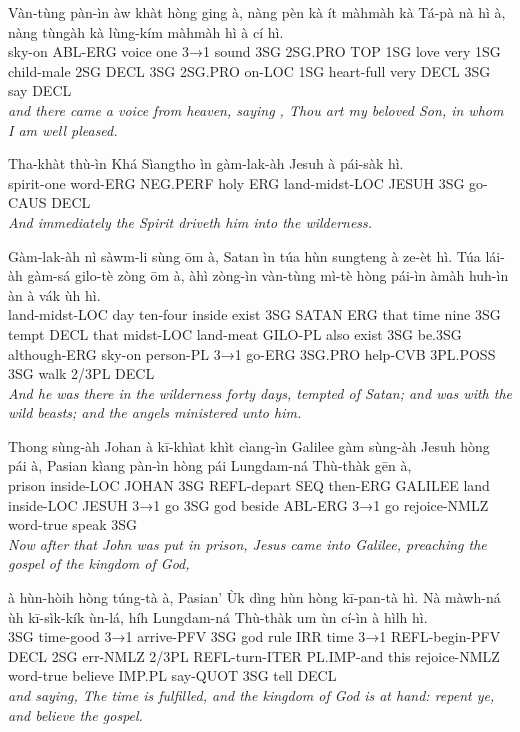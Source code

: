 \documentclass[11pt,a4paper]{article}
\begin{document}
\begin{exe}
\gll Vàn-tùng pàn-ìn àw khàt hòng ging à, nàng pèn kà ít màhmàh kà Tá-pà nà hì à, nàng tùngàh kà lùng-kím màhmàh hì à cí hì. \\
     sky-on ABL-ERG voice one 3→1 sound 3SG 2SG.PRO TOP 1SG love very 1SG child-male 2SG DECL 3SG 2SG.PRO on-LOC 1SG heart-full very DECL 3SG say DECL \\
\glt \textcolor{kjvcolor}{\textit{and there came a voice from heaven, saying , Thou art my beloved Son, in whom I am well pleased.}}

\gll Tha-khàt thù-ìn Khá Sìangtho ìn gàm-lak-àh Jesuh à pái-sàk hì. \\
     spirit-one word-ERG NEG.PERF holy ERG land-midst-LOC JESUH 3SG go-CAUS DECL \\
\glt \textcolor{kjvcolor}{\textit{And immediately the Spirit driveth him into the wilderness.}}

\gll Gàm-lak-àh nì sàwm-li sùng ōm à, Satan ìn túa hùn sungteng à ze-èt hì. Túa lái-àh gàm-sá gilo-tè zòng ōm à, àhì zòng-ìn vàn-tùng mì-tè hòng pái-ìn àmàh huh-ìn àn à vák ùh hì. \\
     land-midst-LOC day ten-four inside exist 3SG SATAN ERG that time nine 3SG tempt DECL that midst-LOC land-meat GILO-PL also exist 3SG be.3SG although-ERG sky-on person-PL 3→1 go-ERG 3SG.PRO help-CVB 3PL.POSS 3SG walk 2/3PL DECL \\
\glt \textcolor{kjvcolor}{\textit{And he was there in the wilderness forty days, tempted of Satan; and was with the wild beasts; and the angels ministered unto him.}}

\gll Thong sùng-àh Johan à kī-khìat khìt cìang-ìn Galilee gàm sùng-àh Jesuh hòng pái à, Pasian kìang pàn-ìn hòng pái Lungdam-ná Thù-thàk gēn à, \\
     prison inside-LOC JOHAN 3SG REFL-depart SEQ then-ERG GALILEE land inside-LOC JESUH 3→1 go 3SG god beside ABL-ERG 3→1 go rejoice-NMLZ word-true speak 3SG \\
\glt \textcolor{kjvcolor}{\textit{Now after that John was put in prison, Jesus came into Galilee, preaching the gospel of the kingdom of God,}}

\gll à hùn-hòih hòng túng-tà à, Pasian' Ùk dìng hùn hòng kī-pan-tà hì. Nà màwh-ná ùh kī-sìk-kík ùn-lá, híh Lungdam-ná Thù-thàk um ùn cí-ìn à hìlh hì. \\
     3SG time-good 3→1 arrive-PFV 3SG god rule IRR time 3→1 REFL-begin-PFV DECL 2SG err-NMLZ 2/3PL REFL-turn-ITER PL.IMP-and this rejoice-NMLZ word-true believe IMP.PL say-QUOT 3SG tell DECL \\
\glt \textcolor{kjvcolor}{\textit{and saying, The time is fulfilled, and the kingdom of God is at hand: repent ye, and believe the gospel.}}


\end{exe}
\end{document}
